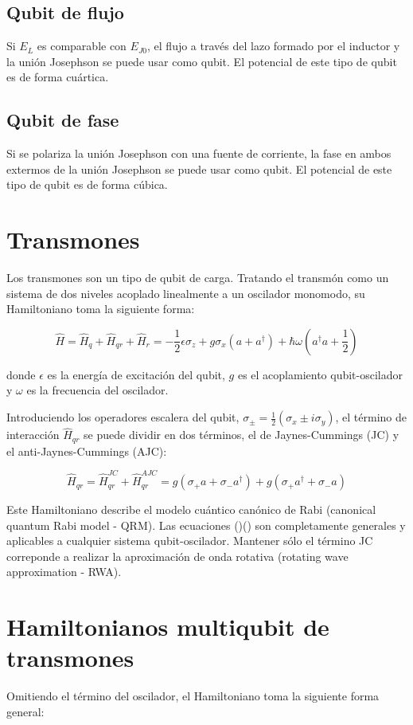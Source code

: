 \subsection{Qubit de flujo}

Si $E_L$ es comparable con $E_{J0}$, el flujo a través del lazo formado por el inductor y la unión Josephson se puede usar como qubit. El potencial de este tipo de qubit es de forma cuártica.

\subsection{Qubit de fase}

Si se polariza la unión Josephson con una fuente de corriente, la fase en ambos extermos de la unión Josephson se puede usar como qubit. El potencial de este tipo de qubit es de forma cúbica.

\section{Transmones}

Los transmones son un tipo de qubit de carga. Tratando el transmón como un sistema de dos niveles acoplado linealmente a un oscilador monomodo, su Hamiltoniano toma la siguiente forma:

\[
\hat{H} = \hat{H}_q + \hat{H}_{qr} + \hat{H}_r = -\frac{1}{2} \epsilon \sigma_z + g \sigma_x (a+a^\dag) + \hbar \omega (a^\dag a + \frac{1}{2})
\]

donde $\epsilon$ es la energía de excitación del qubit, $g$ es el acoplamiento qubit-oscilador y $\omega$ es la frecuencia del oscilador.

Introduciendo los operadores escalera del qubit, $\sigma_\pm = \frac{1}{2}(\sigma_x \pm i \sigma_y)$, el término de interacción $\hat{H}_{qr}$ se puede dividir en dos términos, el de Jaynes-Cummings (JC) y el anti-Jaynes-Cummings (AJC):

\[
\hat{H}_{qr} = \hat{H}_{qr}^{JC} + \hat{H}_{qr}^{AJC} = g(\sigma_+ a + \sigma_- a^\dag) + g(\sigma_+ a^\dag + \sigma_- a)
\]

Este Hamiltoniano describe el modelo cuántico canónico de Rabi (canonical quantum Rabi model - QRM). Las ecuaciones ()() son completamente generales y aplicables a cualquier sistema qubit-oscilador. Mantener sólo el término JC correponde a realizar la aproximación de onda rotativa (rotating wave approximation - RWA).

\section{Hamiltonianos multiqubit de transmones}
Omitiendo el término del oscilador, el Hamiltoniano toma la siguiente forma general:

